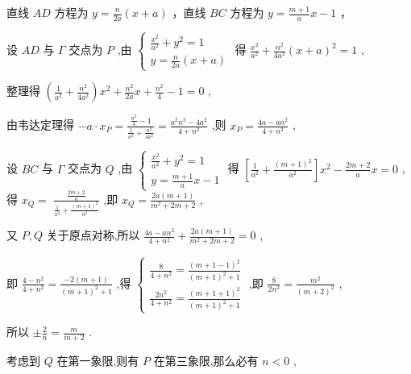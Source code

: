 \documentclass[10pt]{article}
\begin{document}
直线 \({AD}\) 方程为 \(y = \frac{n}{2a}\left( {x + a}\right)\) ，直线 \({BC}\) 方程为 \(y = \frac{m + 1}{a}x - 1\) ，

设 \({AD}\) 与 \(\Gamma\) 交点为 \(P\) ,由 \(\left\{  \begin{array}{l} \frac{{x}^{2}}{{a}^{2}} + {y}^{2} = 1 \\  y = \frac{n}{2a}\left( {x + a}\right)  \end{array}\right.\) 得 \(\frac{{x}^{2}}{{a}^{2}} + \frac{{n}^{2}}{4{a}^{2}}{\left( x + a\right) }^{2} = 1\) ,

整理得 \(\left( {\frac{1}{{a}^{2}} + \frac{{n}^{2}}{4{a}^{2}}}\right) {x}^{2} + \frac{{n}^{2}}{2a}x + \frac{{n}^{2}}{4} - 1 = 0\) ,

由韦达定理得 \(- a \cdot  {x}_{P} = \frac{\frac{{n}^{2}}{4} - 1}{\frac{1}{{a}^{2}} + \frac{{n}^{2}}{4{a}^{2}}} = \frac{{a}^{2}{n}^{2} - 4{a}^{2}}{4 + {n}^{2}}\) ,则 \({x}_{P} = \frac{{4a} - a{n}^{2}}{4 + {n}^{2}}\) ,

设 \({BC}\) 与 \(\Gamma\) 交点为 \(Q\) ,由 \(\left\{  \begin{array}{l} \frac{{x}^{2}}{{a}^{2}} + {y}^{2} = 1 \\  y = \frac{m + 1}{a}x - 1 \end{array}\right.\) 得 \(\left\lbrack  {\frac{1}{{a}^{2}} + \frac{{\left( m + 1\right) }^{2}}{{a}^{2}}}\right\rbrack  {x}^{2} - \frac{{2m} + 2}{a}x = 0\) ,得 \({x}_{Q} = \; \frac{\frac{{2m} + 2}{a}}{\frac{1}{{a}^{2}} + \frac{{\left( m + 1\right) }^{2}}{{a}^{2}}}\) ,即 \({x}_{Q} = \frac{{2a}\left( {m + 1}\right) }{{m}^{2} + {2m} + 2}\) ,

又 \(P,Q\) 关于原点对称,所以 \(\frac{{4a} - a{n}^{2}}{4 + {n}^{2}} + \frac{{2a}\left( {m + 1}\right) }{{m}^{2} + {2m} + 2} = 0\) ,

即 \(\frac{4 - {n}^{2}}{4 + {n}^{2}} = \frac{-2\left( {m + 1}\right) }{{\left( m + 1\right) }^{2} + 1}\) ,得 \(\left\{  \begin{array}{l} \frac{8}{4 + {n}^{2}} = \frac{{\left( m + 1 - 1\right) }^{2}}{{\left( m + 1\right) }^{2} + 1} \\  \frac{2{n}^{2}}{4 + {n}^{2}} = \frac{{\left( m + 1 + 1\right) }^{2}}{{\left( m + 1\right) }^{2} + 1} \end{array}\right.\) ,即 \(\frac{8}{2{n}^{2}} = \frac{{m}^{2}}{{\left( m + 2\right) }^{2}}\) ,

所以 \(\pm  \frac{2}{n} = \frac{m}{m + 2}\) .

考虑到 \(Q\) 在第一象限,则有 \(P\) 在第三象限,那么必有 \(n < 0\) ,
\end{document}
